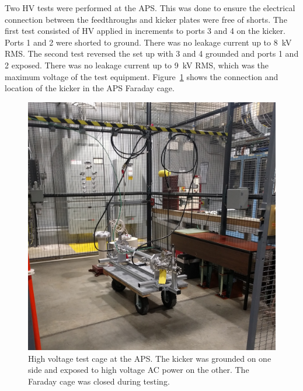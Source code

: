 Two HV tests were performed at the APS. This was done to ensure the electrical connection 
between the feedthroughs and kicker plates were free of shorts. 
The first test consisted of HV applied in increments to ports 3 and 4 on the kicker.  
Ports 1 and 2 were shorted to ground. There was no leakage current up to \SI{8}{kV} RMS.
The second test reversed the set up with 3 and 4 grounded and ports 1 and 2 exposed. 
There was no leakage current up to \SI{9}{kV} RMS, which was the maximum voltage of the test equipment.
Figure~\ref{fig:AWAHVkicker} shows the connection and location of the kicker in the APS Faraday cage.
\begin{figure}%
	\begin{center}
		\includegraphics[width=\textwidth]{./images/kicker1}
		\caption{High voltage test cage at the APS. 
			The kicker was grounded on one side and exposed to high voltage AC power on the other. 
			The Faraday cage was closed during testing. }
		\label{fig:AWAHVkicker}
	\end{center}
\end{figure}


